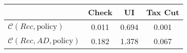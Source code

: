 \begin{tabular}{@{}lccc@{}} 
\toprule 
                          & Check      & UI    & Tax Cut    \\  \midrule 
$\mathcal{C}(Rec,\text{policy})$ & 0.011  & 0.694  & 0.001     \\ 
$\mathcal{C}(Rec, AD,\text{policy})$ & 0.182  & 1.378  & 0.067     \\ 
\end{tabular}  
